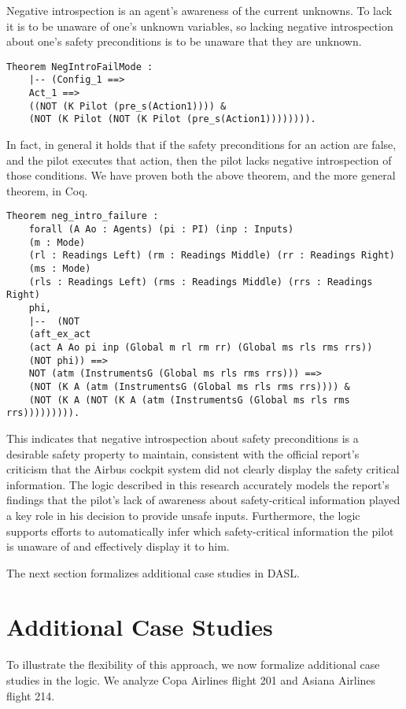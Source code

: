 Negative introspection is an agent's awareness of the current unknowns. To lack it is to be unaware of one's unknown variables, so lacking negative introspection about one's safety preconditions is to be unaware that they are unknown.
\begin{tcolorbox}\begin{lstlisting}[language=Coq]
	Theorem NegIntroFailMode : 
	|-- (Config_1 ==> 
	Act_1 ==>
	((NOT (K Pilot (pre_s(Action1)))) &
	(NOT (K Pilot (NOT (K Pilot (pre_s(Action1)))))))).
	\end{lstlisting}\end{tcolorbox}
In fact, in general it holds that if the safety preconditions for an action are false, and the pilot executes that action, then the pilot lacks negative introspection of those conditions. We have proven both the above theorem, and the more general theorem, in Coq.
\begin{tcolorbox}\begin{lstlisting}[language=Coq]
	Theorem neg_intro_failure : 
	forall (A Ao : Agents) (pi : PI) (inp : Inputs) 
	(m : Mode) 
	(rl : Readings Left) (rm : Readings Middle) (rr : Readings Right) 
	(ms : Mode) 
	(rls : Readings Left) (rms : Readings Middle) (rrs : Readings Right) 
	phi,
	|--  (NOT 
	(aft_ex_act 
	(act A Ao pi inp (Global m rl rm rr) (Global ms rls rms rrs)) 
	(NOT phi)) ==>
	NOT (atm (InstrumentsG (Global ms rls rms rrs))) ==>
	(NOT (K A (atm (InstrumentsG (Global ms rls rms rrs)))) & 
	(NOT (K A (NOT (K A (atm (InstrumentsG (Global ms rls rms rrs))))))))).
	\end{lstlisting}
\end{tcolorbox}
This indicates that negative introspection about safety preconditions is a desirable safety property to maintain, consistent with the official report's criticism that the Airbus cockpit system did not clearly display the safety critical information. The logic described in this research accurately models the report's findings that the pilot's lack of awareness about safety-critical information played a key role in his decision to provide unsafe inputs. Furthermore, the logic supports efforts to automatically infer which safety-critical information the pilot is unaware of and effectively display it to him. 

The next section formalizes additional case studies in DASL.

\section{Additional Case Studies}
\noindent
To illustrate the flexibility of this approach, we now formalize additional case studies in the logic. We analyze Copa Airlines flight 201 and Asiana Airlines flight 214.

